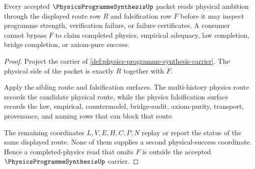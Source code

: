 \begin{theorem}
\label{thm:physics-programme-synthesis-falsification-nonescape}
Every accepted $\PhysicsProgrammeSynthesisUp$ packet reads physical ambition through the displayed route row $R$ and falsification row $F$ before it may inspect programme strength, verification failure, or failure certificates. A consumer cannot bypass $F$ to claim completed physics, empirical adequacy, law completion, bridge completion, or axiom-pure success.
\end{theorem}
\begin{proof}
Project the carrier of \autoref{def:physics-programme-synthesis-carrier}. The physical side of the packet is exactly $R$ together with $F$.

Apply the sibling route and falsification surfaces. The multi-history physics route records the candidate physical route, while the physics falsification surface records the law, empirical, countermodel, bridge-audit, axiom-purity, transport, provenance, and naming rows that can block that route.

The remaining coordinates $L,V,E,H,C,P,N$ replay or report the status of the same displayed route. None of them supplies a second physical-success coordinate. Hence a completed-physics read that omits $F$ is outside the accepted $\PhysicsProgrammeSynthesisUp$ carrier.
\end{proof}

